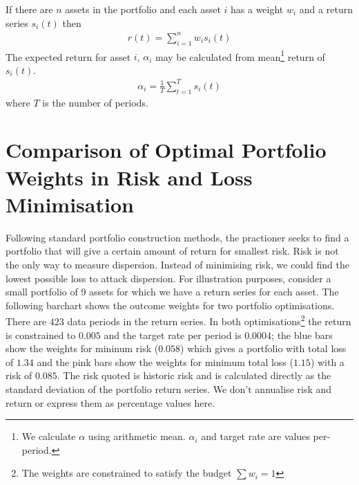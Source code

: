 \documentclass[12pt]{article}
\begin{document}
If there are $n$ assets in the portfolio and each asset $i$
has a weight $w_i$ and a return series $s_i (t)$ then
\begin{eqnarray}
    r(t) = \sum_{i=1}^{n} w_i s_i(t)
\end{eqnarray}
The expected return for asset $i$, $\alpha_i$ may be calculated from
mean\footnote{We calculate $\alpha$ using arithmetic mean. $\alpha_i$ and target rate are values per-period.} 
return of $s_i(t)$.
\begin{eqnarray}
    \alpha_i =  \frac{1}{T}\sum_{t=1}^{T} s_i(t)
\end{eqnarray}
where $T$ is the number of periods.

\section{Comparison of Optimal Portfolio Weights in Risk and Loss Minimisation}

Following standard portfolio construction methods, the practioner seeks to find a portfolio that 
will give a certain amount of return for smallest risk. Risk is not the only way to measure 
dispersion. Instead of minimising risk, we could find the 
lowest possible loss to attack dispersion. For illustration purposes, consider a small portfolio of 9 assets
for which we have a return series for each asset.
The following barchart shows the outcome weights for two portfolio optimisations. There are $423$ data periods in the
return series. In both optimisations\footnote{The weights are constrained to satisfy the budget $\sum w_i = 1$} the return is 
constrained to $0.005$ and the target rate per period is $0.0004$; the blue bars show the weights
for mininum risk ($0.058$) which gives a portfolio with total loss of $1.34$ and the pink bars show
the weights for minimum total loss ($1.15$) with a risk of $0.085$. The risk quoted is historic risk and is 
calculated directly as the standard deviation of the portfolio return series. We don't annualise risk and return or 
express them as percentage values here.


\end{document}
